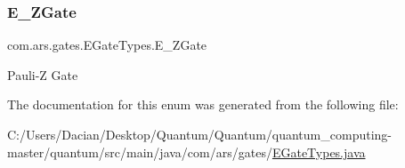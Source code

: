 \subsubsection{\texorpdfstring{E\+\_\+\+Z\+Gate}{E\_ZGate}}
{\footnotesize\ttfamily com.\+ars.\+gates.\+E\+Gate\+Types.\+E\+\_\+\+Z\+Gate}

Pauli-\/Z Gate 

The documentation for this enum was generated from the following file\+:\begin{DoxyCompactItemize}
\item 
C\+:/\+Users/\+Dacian/\+Desktop/\+Quantum/\+Quantum/quantum\+\_\+computing-\/master/quantum/src/main/java/com/ars/gates/\hyperlink{_e_gate_types_8java}{E\+Gate\+Types.\+java}\end{DoxyCompactItemize}
